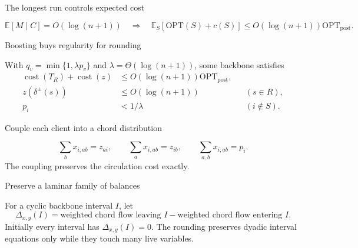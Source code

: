 \documentclass[aspectratio=169,12pt]{beamer}
\newcommand{\OPT}{\mathrm{OPT}}
\newcommand{\optpost}{\OPT_{\mathrm{post}}}
\newcommand{\E}{\mathbb{E}}
\newcommand{\cost}{\operatorname{cost}}
\newcommand{\1}{\mathbf{1}}
\begin{document}
\begin{frame}{The longest run controls expected cost}
  \centering
  \resizebox{0.80\linewidth}{!}{\StLongestRun}

  \vspace{0.08cm}
  {\fontsize{12pt}{14.5pt}\selectfont
  \[
    \E[M\mid C]=O(\log(n+1))
    \quad\Longrightarrow\quad
    \E_S[\OPT(S)+c(S)]
    \le O(\log(n+1))\optpost.
  \]}
\end{frame}

\begin{frame}{Boosting buys regularity for rounding}
  \centering
  \resizebox{0.94\linewidth}{!}{\StBoostedBackbone}

  \vspace{0.24cm}
  With \(q_v=\min\{1,\lambda p_v\}\) and
  \(\lambda=\Theta(\log(n+1))\), some backbone satisfies
  \[
  \begin{aligned}
    \cost(T_R)+\cost(z)
      &\le O(\log(n+1))\optpost,\\
    z(\delta^\pm(s))
      &\le O(\log(n+1)) &&(s\in R),\\
    p_i&<1/\lambda &&(i\notin S).
  \end{aligned}
  \]
\end{frame}

\begin{frame}{Couple each client into a chord distribution}
  \centering
  \resizebox{0.58\linewidth}{!}{\StChordCoupling}

  \vspace{-0.02cm}
  {\fontsize{11.8pt}{14pt}\selectfont
  \[
    \sum_b x_{i,ab}=z_{ai},
    \qquad
    \sum_a x_{i,ab}=z_{ib},
    \qquad
    \sum_{a,b}x_{i,ab}=p_i.
  \]}
  The coupling preserves the circulation cost exactly.
\end{frame}

\begin{frame}{Preserve a laminar family of balances}
  \centering
  \resizebox{0.94\linewidth}{!}{\StDyadicIntervals}

  \vspace{0.10cm}
  For a cyclic backbone interval \(I\), let
  \[
    \Delta_{x,y}(I)
    =\text{weighted chord flow leaving \(I\)}
     -\text{weighted chord flow entering \(I\)}.
  \]
  Initially every interval has \(\Delta_{x,y}(I)=0\). The rounding preserves
  dyadic interval equations only while they touch many live variables.
\end{frame}
\end{document}
